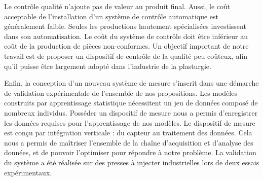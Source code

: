 Le contrôle qualité n'ajoute pas de valeur au produit final.
Aussi, le coût acceptable de l'installation d'un système de contrôle automatique est généralement faible.
Seules les productions hautement spécialisées investissent dans son automatisation.
Le coût du système de contrôle doit être inférieur au coût de la production de pièces non-conformes.
Un objectif important de notre travail est de proposer un dispositif de contrôle de la qualité peu coûteux, afin qu'il puisse être largement adopté dans l'industrie de la plasturgie.  %


Enfin, la conception d'un nouveau système de mesure s'inscrit dans une démarche de validation expérimentale de l'ensemble de nos propositions.
Les modèles construits par apprentissage statistique nécessitent un jeu de données composé de nombreux individus.
Posséder un dispositif de mesure nous a permis d'enregistrer les données requises pour l'apprentissage de nos modèles.
Le dispositif de mesure est conçu par intégration verticale : du capteur au traitement des données.
Cela nous a permis de maîtriser l'ensemble de la chaîne d'acquisition et d'analyse des données, et de pouvoir l'optimiser pour répondre à notre problème.
La validation du système a été réalisée sur des presses à injecter industrielles lors de deux essais expérimentaux.

